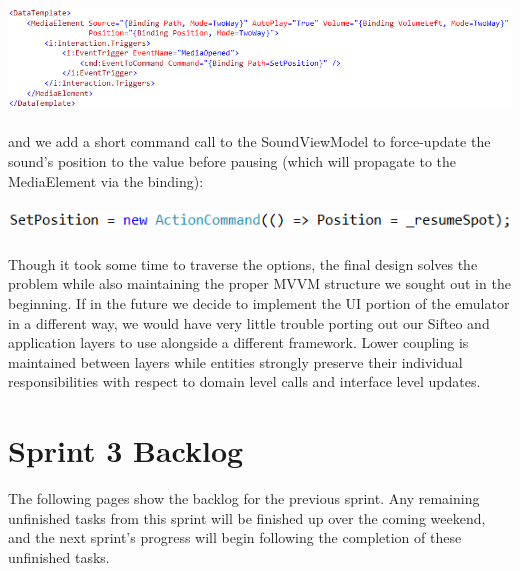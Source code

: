 \documentclass[12pt]{article}
\begin{document}
\includegraphics[scale=.65]{xamlCode.png} \\\\
and we add a short command call to the SoundViewModel to force-update the sound’s position to the value before pausing (which will propagate to the MediaElement via the binding): \\\\
\includegraphics[scale=.65]{commandCode.png} \\\\
Though it took some time to traverse the options, the final design solves the problem while also maintaining the proper MVVM structure we sought out in the beginning. If in the future we decide to implement the UI portion of the emulator in a different way, we would have very little trouble porting out our Sifteo and application layers to use alongside a different framework. Lower coupling is maintained between layers while entities strongly preserve their individual responsibilities with respect to domain level calls and interface level updates.

\section*{Sprint 3 Backlog}
The following pages show the backlog for the previous sprint. Any remaining unfinished tasks from this sprint will be finished up over the coming weekend, and the next sprint's progress will begin following the completion of these unfinished tasks.


\end{document}

